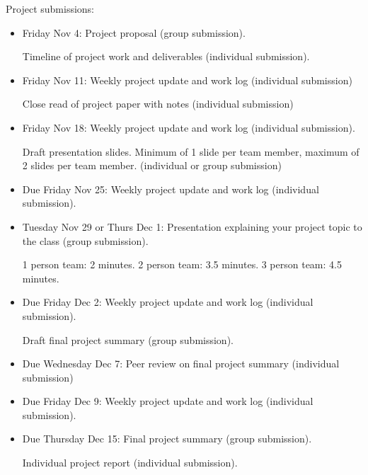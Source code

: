 \documentclass[12pt,letterpaper,noanswers]{exam}
\begin{document}
\noindent Project submissions:
\begin{itemize}
    \item Friday Nov 4: Project proposal (group submission).  
    
    Timeline of project work and deliverables (individual submission).
    \item Friday Nov 11: Weekly project update and work log (individual submission)
    
    Close read of project paper with notes (individual submission)

    \item Friday Nov 18: Weekly project update and work log (individual submission).  
    
    Draft presentation slides.  Minimum of 1 slide per team member, maximum of 2 slides per team member.  (individual or group submission)
    \item Due Friday Nov 25: Weekly project update and work log (individual submission).  
    \item Tuesday Nov 29 or Thurs Dec 1: Presentation explaining your project topic to the class (group submission).  
    
    1 person team: 2 minutes.  2 person team: 3.5 minutes.  3 person team: 4.5 minutes.
    \item Due Friday Dec 2: Weekly project update and work log (individual submission).  
    
    Draft final project summary (group submission).
    \item Due Wednesday Dec 7: Peer review on final project summary (individual submission)
    \item Due Friday Dec 9: Weekly project update and work log (individual submission).
    \item Due Thursday Dec 15: Final project summary (group submission).  
    
    Individual project report (individual submission).
\end{itemize}
\end{document}
